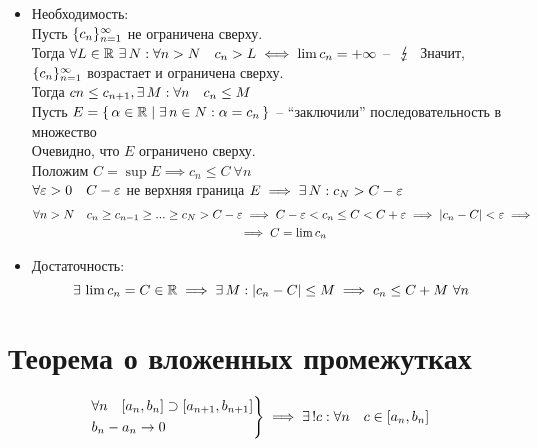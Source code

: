 \begin{replacementproof}
	\hfill
	\begin{itemize}
		\item Необходимость: \\
		Пусть $\{c_n\}_{n=1}^{\infty}$ не ограничена сверху. \\
		Тогда $ \forall L \in \mathbb{R} ~ \exists\, N : \forall n > N \quad c_n > L \iff \lim c_n = + \infty $ -- $\contra$
		Значит, $\{c_n\}_{n=1}^{\infty}$ возрастает и ограничена сверху. \\
		Тогда $cn \le c_{n+1}, \exists\, M : \forall n \quad c_n \le M $ \\
		Пусть $E = \set{\alpha \in \ensuremath{\mathbb{R}}| \exists\,n \in N : \alpha = c_n} $ -- ``заключили'' последовательность в множество \\
		Очевидно, что $E$ ограничено сверху. \\
		Положим $C = \sup E \implies c_n \le C ~ \forall n $ \\
		$ \forall \varepsilon > 0 \quad C - \varepsilon $ не верхняя граница $E \implies \exists\, N : c_N > C - \varepsilon $
		\begin{multline*}
			\forall n > N \quad c_n \ge c_{n-1} \ge ... \ge c_N > C - \varepsilon \implies C - \varepsilon < c_n \le C < C + \varepsilon \implies | c_n - C | < \varepsilon \implies \\ \implies C = \lim c_n
		\end{multline*}
		\item Достаточность:
		$$ \exists\, \lim c_n = C \in \mathbb{R} \implies \exists\, M : |c_n - C| \le M \implies c_n \le C + M ~ \forall n $$
	\end{itemize}
\end{replacementproof}

\section{Теорема о вложенных промежутках}

\begin{theorem}
	$$ \begin{rcases}
	   	\forall n \quad [a_n,b_n] \supset [a_{n+1},b_{n+1}] \\
		b_n - a_n \to 0
	   \end{rcases} \implies \exists\,! c : \forall n \quad c \in [a_n,b_n] $$
\end{theorem}


